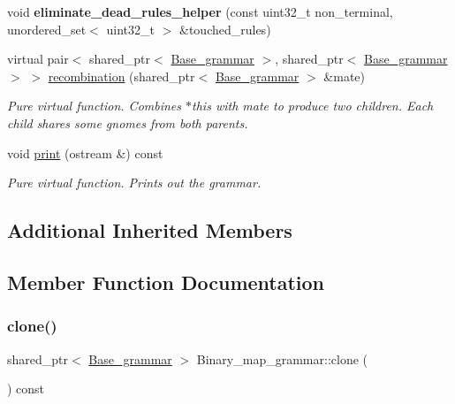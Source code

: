 \begin{DoxyCompactItemize}
\mbox{\label{classBinary__map__grammar_a86a68eca126a1740dd406457abaf2d05}} 
void {\bfseries eliminate\+\_\+dead\+\_\+rules\+\_\+helper} (const uint32\+\_\+t non\+\_\+terminal, unordered\+\_\+set$<$ uint32\+\_\+t $>$ \&touched\+\_\+rules)
\item 
virtual pair$<$ shared\+\_\+ptr$<$ \mbox{\hyperlink{classBase__grammar}{Base\+\_\+grammar}} $>$, shared\+\_\+ptr$<$ \mbox{\hyperlink{classBase__grammar}{Base\+\_\+grammar}} $>$ $>$ \mbox{\hyperlink{classBinary__map__grammar_a81761711a54269d1a48e196eaa3fe9e4}{recombination}} (shared\+\_\+ptr$<$ \mbox{\hyperlink{classBase__grammar}{Base\+\_\+grammar}} $>$ \&mate)
\begin{DoxyCompactList}\small\item\em Pure virtual function. Combines $\ast$this with mate to produce two children. Each child shares some gnomes from both parents. \end{DoxyCompactList}\item 
void \mbox{\hyperlink{classBinary__map__grammar_a2c96df3dd0ae512c4de573e1e1cd63e5}{print}} (ostream \&) const
\begin{DoxyCompactList}\small\item\em Pure virtual function. Prints out the grammar. \end{DoxyCompactList}\end{DoxyCompactItemize}
\subsection*{Additional Inherited Members}


\subsection{Member Function Documentation}
\mbox{\label{classBinary__map__grammar_a701a7d073e76cea7dfedfbd514c3fac7}} 
\subsubsection{\texorpdfstring{clone()}{clone()}}
{\footnotesize\ttfamily shared\+\_\+ptr$<$ \mbox{\hyperlink{classBase__grammar}{Base\+\_\+grammar}} $>$ Binary\+\_\+map\+\_\+grammar\+::clone (\begin{DoxyParamCaption}{ }\end{DoxyParamCaption}) const\hspace{0.3cm}{\ttfamily [virtual]}}



